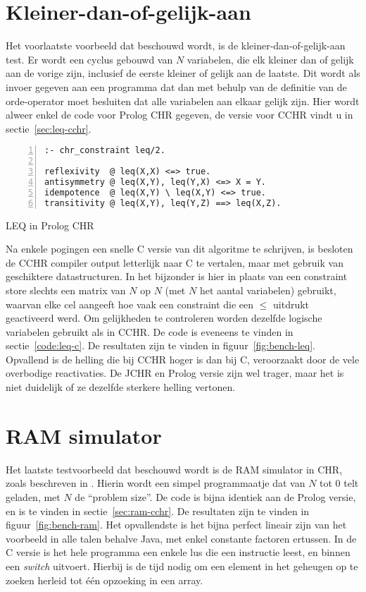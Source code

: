 \section{Kleiner-dan-of-gelijk-aan} \label{sec:bench-leq}

Het voorlaatste voorbeeld dat beschouwd wordt, is de kleiner-dan-of-gelijk-aan test. Er wordt een cyclus gebouwd van $N$ variabelen, die elk kleiner dan of gelijk aan de vorige zijn, inclusief de eerste kleiner of gelijk aan de laatste. Dit wordt als invoer gegeven aan een programma dat dan met behulp van de definitie van de orde-operator moet besluiten dat alle variabelen aan elkaar gelijk zijn. Hier wordt alweer enkel de code voor Prolog CHR gegeven, de versie voor CCHR vindt u in sectie~\ref{sec:leq-cchr}.
\begin{exCode}
\begin{Verbatim}[frame=single,numbers=left]
:- chr_constraint leq/2.

reflexivity  @ leq(X,X) <=> true.
antisymmetry @ leq(X,Y), leq(Y,X) <=> X = Y.
idempotence  @ leq(X,Y) \ leq(X,Y) <=> true.
transitivity @ leq(X,Y), leq(Y,Z) ==> leq(X,Z).
\end{Verbatim}
\caption{\label{code:leq} LEQ in Prolog CHR}
\end{exCode}
Na enkele pogingen een snelle C versie van dit algoritme te schrijven, is besloten de CCHR compiler output letterlijk naar C te vertalen, maar met gebruik van geschiktere datastructuren. In het bijzonder is hier in plaats van een constraint store slechts een matrix van $N$ op $N$ (met $N$ het aantal variabelen) gebruikt, waarvan elke cel aangeeft hoe vaak een constraint die een $\leq$ uitdrukt geactiveerd werd. Om gelijkheden te controleren worden dezelfde logische variabelen gebruikt als in CCHR. De code is eveneens te vinden in sectie~\ref{code:leq-c}.
De resultaten zijn te vinden in figuur~\ref{fig:bench-leq}. Opvallend is de helling die bij CCHR hoger is dan bij C, veroorzaakt door de vele overbodige reactivaties. De JCHR en Prolog versie zijn wel trager, maar het is niet duidelijk of ze dezelfde sterkere helling vertonen.

\section{RAM simulator} \label{sec:bench-ram}

Het laatste testvoorbeeld dat beschouwd wordt is de RAM simulator in CHR, zoals beschreven in \cite{jon:complexity:chr05}.
Hierin wordt een simpel programmaatje dat van $N$ tot $0$ telt geladen, met $N$ de ``problem size''. De code is bijna identiek aan de Prolog versie, en is te vinden in sectie~\ref{sec:ram-cchr}.
De resultaten zijn te vinden in figuur~\ref{fig:bench-ram}. Het opvallendste is het bijna perfect lineair zijn van het voorbeeld in alle talen behalve Java, met enkel constante factoren ertussen. In de C versie is het hele programma een enkele lus die een instructie leest, en binnen een {\em switch} uitvoert. Hierbij is de tijd nodig om een element in het geheugen op te zoeken herleid tot \'e\'en opzoeking in een array.

